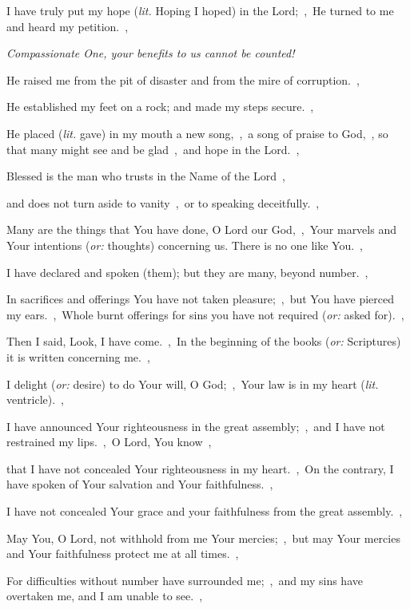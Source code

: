 \documentclass[12pt,twoside,a5paper]{article}
\newcommand{\qanona}[1]{{\liturgicalhint{Qanona.} \emph{#1}}}
\newcommand{\translationoption}[1]{\emph{or:} #1}
\newcommand{\translationliteral}[1]{\emph{lit.} #1}
\begin{document}
\begin{normalparskip}
  I have truly put my hope (\translationliteral{Hoping I hoped}) in the Lord;~\sep\ He turned to me and heard my petition.~\sep

  \qanona{Compassionate One, your benefits to us cannot be counted!}

  He raised me from the pit of disaster and from the mire of corruption.~\sep

  He established my feet on a rock; and made my steps secure.~\sep

  He placed (\translationliteral{gave}) in my mouth a new song,~\sep\ a song of praise to God,~\sep
  so that many might see and be glad~\sep\ and hope in the Lord.~\sep

  Blessed is the man who trusts in the Name of the Lord~\sep

  and does not turn aside to vanity~\sep\ or to speaking deceitfully.~\sep

  Many are the things that You have done, O Lord our God,~\sep\ Your marvels and Your intentions (\translationoption{thoughts}) concerning us. There is no one like You.~\sep

  I have declared and spoken (them); but they are many, beyond number.~\sep

  In sacrifices and offerings You have not taken pleasure;~\sep\ but You have pierced my ears.~\sep\ Whole burnt offerings for sins you have not required (\translationoption{asked for}).~\sep

  Then I said, Look, I have come.~\sep\ In the beginning of the books (\translationoption{Scriptures}) it is written concerning me.~\sep

  I delight (\translationoption{desire}) to do Your will, O God;~\sep\ Your law is in my heart (\translationliteral{ventricle}).~\sep

  I have announced Your righteousness in the great assembly;~\sep\ and I have not restrained my lips.~\sep\ O Lord, You know~\sep

  that I have not concealed Your righteousness in my heart.~\sep\ On the contrary, I have spoken of Your salvation and Your faithfulness.~\sep

  I have not concealed Your grace and your faithfulness from the great assembly.~\sep

  May You, O Lord, not withhold from me Your mercies;~\sep\ but may Your mercies and Your faithfulness protect me at all times.~\sep

  For difficulties without number have surrounded me;~\sep\ and my sins have overtaken me, and I am unable to see.~\sep


\end{normalparskip}
\end{document}
